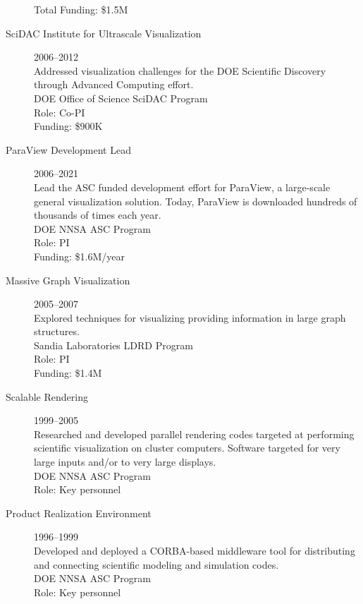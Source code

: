 \documentclass{article}
\begin{document}
\begin{description}
  Total Funding: \$1.5M
\item[SciDAC Institute for Ultrascale Visualization]\hfill 2006--2012\\
  Addressed visualization challenges for the DOE Scientific Discovery through Advanced Computing effort.\\
  DOE Office of Science SciDAC Program\\
  Role: Co-PI\\
  Funding: \$900K
\item[ParaView Development Lead]\hfill 2006--2021\\
  Lead the ASC funded development effort for ParaView, a large-scale
  general visualization solution. Today, ParaView is downloaded hundreds of thousands of times each year.\\
  DOE NNSA ASC Program\\
  Role: PI\\
  Funding: \$1.6M/year %
\item[Massive Graph Visualization]\hfill 2005--2007 \\
  Explored techniques for visualizing providing information in large
  graph structures.\\
  Sandia Laboratories LDRD Program\\
  Role: PI\\
  Funding: \$1.4M
\item[Scalable Rendering]\hfill 1999--2005 \\
  Researched and developed parallel rendering codes targeted at performing scientific visualization on cluster computers.  Software targeted for very large inputs and/or to very large displays.\\
  DOE NNSA ASC Program\\
  Role: Key personnel
\item[Product Realization Environment]\hfill 1996--1999 \\
  Developed and deployed a CORBA-based middleware tool for distributing
  and connecting scientific modeling and simulation codes.\\
  DOE NNSA ASC Program\\
  Role: Key personnel
\end{description}
\end{document}
